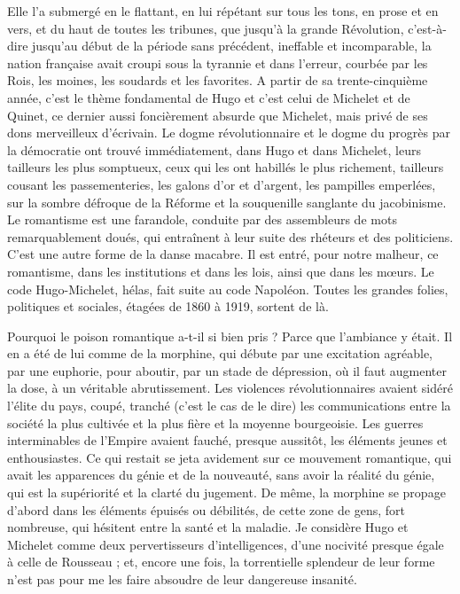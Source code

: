 \documentclass[french,twoside]{book} %
\begin{document}
Elle l’a submergé en le flattant, en lui répétant sur tous les tons, en prose et en vers, et du haut de toutes les tribunes, que jusqu’à la grande Révolution, c’est-à-dire jusqu’au début de la période sans précédent, ineffable et incomparable, la nation française avait croupi sous la tyrannie et dans l’erreur, courbée par les Rois, les moines, les soudards et les favorites. A partir de sa trente-cinquième année, c’est le thème fondamental de Hugo et c’est celui de Michelet et de Quinet, ce dernier aussi foncièrement absurde que Michelet, mais privé de ses dons merveilleux d’écrivain. Le dogme révolutionnaire et le dogme du progrès par la démocratie ont trouvé immédiatement, dans Hugo et dans Michelet, leurs tailleurs les plus somptueux, ceux qui les ont habillés le plus richement, tailleurs cousant les passementeries, les galons d’or et d’argent, les pampilles emperlées, sur la sombre défroque de la Réforme et la souquenille sanglante du jacobinisme. Le romantisme est une farandole, conduite par des assembleurs de mots remarquablement doués, qui entraînent à leur suite des rhéteurs et des politiciens. C’est une autre forme de la danse macabre. Il est entré, pour notre malheur, ce romantisme, dans les institutions et dans les lois, ainsi que dans les mœurs. Le code Hugo-Michelet, hélas, fait suite au code Napoléon. Toutes les grandes folies, politiques et sociales, étagées de 1860 à 1919, sortent de là.\par
Pourquoi le poison romantique a-t-il si bien pris ? Parce que l’ambiance y était. Il en a été de lui comme de la morphine, qui débute par une excitation agréable, par une euphorie, pour aboutir, par un stade de dépression, où il faut augmenter la dose, à un véritable abrutissement. Les violences révolutionnaires avaient sidéré l’élite du pays, coupé, tranché (c’est le cas de le dire) les communications entre la société la plus cultivée et la plus fière et la moyenne bourgeoisie. Les guerres interminables de l’Empire avaient fauché, presque aussitôt, les éléments jeunes et enthousiastes. Ce qui restait se jeta avidement sur ce mouvement romantique, qui avait les apparences du génie et de la nouveauté, sans avoir la réalité du génie, qui est la supériorité et la clarté du jugement. De même, la morphine se propage d’abord dans les éléments épuisés ou débilités, de cette zone de gens, fort nombreuse, qui hésitent entre la santé et la maladie. Je considère Hugo et Michelet comme deux pervertisseurs d’intelligences, d’une nocivité presque égale à celle de Rousseau ; et, encore une fois, la torrentielle splendeur de leur forme n’est pas pour me les faire absoudre de leur dangereuse insanité.\par
\end{document}
